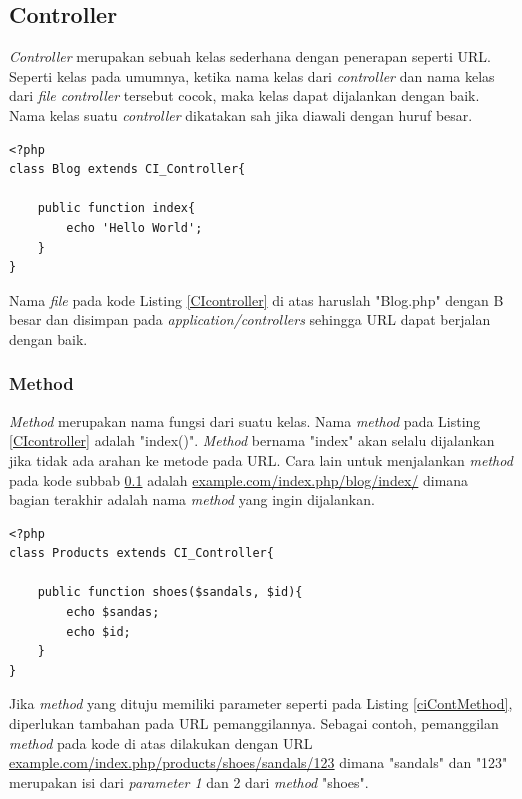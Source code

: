 \subsection{Controller}
\label{sub: controller}

	\textit{Controller} merupakan sebuah kelas sederhana dengan penerapan seperti URL. Seperti kelas pada umumnya, ketika nama kelas dari \textit{controller} dan nama kelas dari \textit{file controller} tersebut cocok, maka kelas dapat dijalankan dengan baik. Nama kelas suatu \textit{controller} dikatakan sah jika diawali dengan huruf besar.
\begin{lstlisting}[caption={CI Controller},label={CIcontroller}]
<?php
class Blog extends CI_Controller{
	
	public function index{
		echo 'Hello World';
	}
}
\end{lstlisting}

	Nama \textit{file} pada kode Listing \ref{CIcontroller} di atas haruslah  "Blog.php" dengan B besar dan disimpan pada \textit{application/controllers} sehingga URL dapat berjalan dengan baik.
	
\subsubsection{Method}
\label{subsub: method}

	\textit{Method} merupakan nama fungsi dari suatu kelas. Nama \textit{method} pada Listing \ref{CIcontroller} adalah "index()". \textit{Method} bernama "index" akan selalu dijalankan jika tidak ada arahan ke metode pada URL. Cara lain untuk menjalankan \textit{method} pada kode subbab \ref{sub: controller} adalah \url{example.com/index.php/blog/index/} dimana bagian terakhir adalah nama \textit{method} yang ingin dijalankan.
	
	
	\begin{lstlisting}[caption=CI Controller Method, label= ciContMethod]
<?php
class Products extends CI_Controller{

	public function shoes($sandals, $id){
		echo $sandas;
		echo $id;
	}
}
	\end{lstlisting}
	
	Jika \textit{method} yang dituju memiliki parameter seperti pada Listing \ref{ciContMethod}, diperlukan tambahan pada URL pemanggilannya. Sebagai contoh, pemanggilan \textit{method}	pada kode di atas dilakukan dengan URL \url{example.com/index.php/products/shoes/sandals/123} dimana "sandals" dan "123" merupakan isi dari \textit{parameter 1} dan 2 dari \textit{method} "shoes".
	
